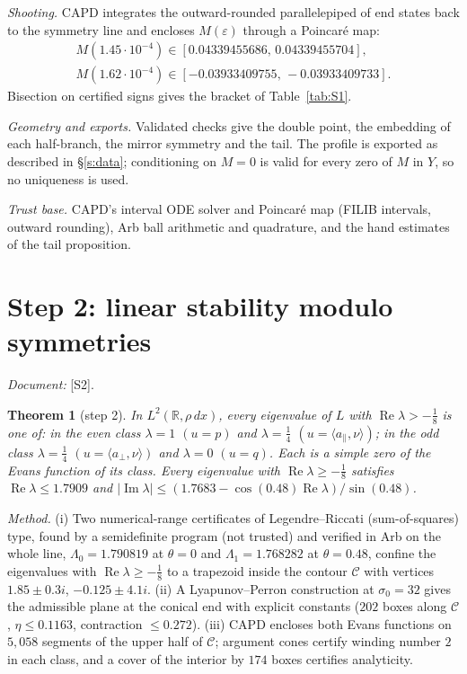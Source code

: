 \documentclass[11pt]{amsart}
\newtheorem{theorem}{Theorem}[section]
\theoremstyle{definition}
\theoremstyle{remark}
\newcommand{\R}{\mathbb{R}}
\newcommand{\eps}{\varepsilon}
\newcommand{\ip}[2]{\langle #1,#2\rangle}
\newcommand{\dref}[1]{[\textsf{#1}]}
\begin{document}
\emph{Shooting.} CAPD integrates the outward-rounded parallelepiped of end states back to the symmetry line and encloses $M(\eps)$ through a Poincar\'e map:
\begin{gather*}M(1.45\cdot10^{-4})\in[0.04339455686,\,0.04339455704],\\ M(1.62\cdot10^{-4})\in[-0.03933409755,\,-0.03933409733].\end{gather*}
Bisection on certified signs gives the bracket of Table~\ref{tab:S1}.

\emph{Geometry and exports.} Validated checks give the double point, the embedding of each half-branch, the mirror symmetry and the tail. The profile is exported as described in \S\ref{s:data}; conditioning on $M=0$ is valid for every zero of $M$ in $Y$, so no uniqueness is used.

\emph{Trust base.} CAPD's interval ODE solver and Poincar\'e map (FILIB intervals, outward rounding), Arb ball arithmetic and quadrature, and the hand estimates of the tail proposition.

\section{Step 2: linear stability modulo symmetries}\label{s:step2}
\emph{Document:} \dref{S2}.
\begin{theorem}[step 2]\label{thm:step2}
In $L^2(\R,\rho\,dx)$, every eigenvalue of $L$ with $\operatorname{Re}\lambda>-\frac18$ is one of: in the even class $\lambda=1$ $(u=p)$ and $\lambda=\frac14$ $(u=\ip{a_\parallel}\nu)$; in the odd class $\lambda=\frac14$ $(u=\ip{a_\perp}\nu)$ and $\lambda=0$ $(u=q)$. Each is a simple zero of the Evans function of its class. Every eigenvalue with $\operatorname{Re}\lambda\ge-\frac18$ satisfies $\operatorname{Re}\lambda\le1.7909$ and $|\operatorname{Im}\lambda|\le(1.7683-\cos(0.48)\operatorname{Re}\lambda)/\sin(0.48)$.
\end{theorem}
\emph{Method.} (i) Two numerical-range certificates of Legendre--Riccati (sum-of-squares) type, found by a semidefinite program (not trusted) and verified in Arb on the whole line, $\Lambda_0=1.790819$ at $\theta=0$ and $\Lambda_1=1.768282$ at $\theta=0.48$, confine the eigenvalues with $\operatorname{Re}\lambda\ge-\frac18$ to a trapezoid inside the contour $\mathcal C$ with vertices $1.85\pm0.3i$, $-0.125\pm4.1i$. (ii) A Lyapunov--Perron construction at $\sigma_0=32$ gives the admissible plane at the conical end with explicit constants ($202$ boxes along $\mathcal C$, $\eta\le0.1163$, contraction $\le0.272$). (iii) CAPD encloses both Evans functions on $5{,}058$ segments of the upper half of $\mathcal C$; argument cones certify winding number $2$ in each class, and a cover of the interior by $174$ boxes certifies analyticity.
\end{document}
